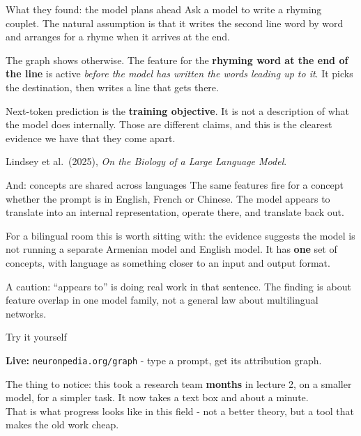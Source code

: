 \documentclass[aspectratio=169]{beamer}
\newcommand{\keybox}[1]{%
  \begin{tcolorbox}[colback=armblue!8, colframe=armblue, boxrule=0.6pt, arc=2pt]
  #1
  \end{tcolorbox}}
\newcommand{\trapbox}[1]{%
  \begin{tcolorbox}[colback=armred!8, colframe=armred, boxrule=0.6pt, arc=2pt]
  #1
  \end{tcolorbox}}
\newcommand{\takebox}[1]{%
  \begin{tcolorbox}[colback=paramgreen!8, colframe=paramgreen, boxrule=0.6pt, arc=2pt]
  #1
  \end{tcolorbox}}
\newcommand{\demobox}[1]{%
  \begin{center}
  \begin{tcolorbox}[colback=violet1!8, colframe=violet1, boxrule=0.7pt, arc=2pt,
                    width=0.9\textwidth]
    \centering\textbf{Live:} #1
  \end{tcolorbox}
  \end{center}}
\begin{document}
\begin{frame}{What they found: the model plans ahead}
  \vspace{0.7em}
  Ask a model to write a rhyming couplet. The natural assumption is that it writes the second
  line word by word and arranges for a rhyme when it arrives at the end.

  \vspace{0.9em}
  \trapbox{The graph shows otherwise. The feature for the \textbf{rhyming word at the end of the
  line} is active \emph{before the model has written the words leading up to it}. It picks the
  destination, then writes a line that gets there.}

  \vspace{0.9em}
  \keybox{Next-token prediction is the \textbf{training objective}. It is not a description of
  what the model does internally. Those are different claims, and this is the clearest evidence
  we have that they come apart.}

  \vspace{0.4em}
  {\footnotesize Lindsey et al.\ (2025), \emph{On the Biology of a Large Language Model}.}
\end{frame}

\begin{frame}{And: concepts are shared across languages}
  \vspace{0.8em}
  The same features fire for a concept whether the prompt is in English, French or Chinese. The
  model appears to translate into an internal representation, operate there, and translate back
  out.

  \vspace{1.0em}
  \keybox{For a bilingual room this is worth sitting with: the evidence suggests the model is not
  running a separate Armenian model and English model. It has \textbf{one} set of concepts, with
  language as something closer to an input and output format.}

  \vspace{0.9em}
  {\footnotesize A caution: ``appears to'' is doing real work in that sentence. The finding is
  about feature overlap in one model family, not a general law about multilingual networks.}
\end{frame}

\begin{frame}{Try it yourself}
  \vspace{1.1em}
  \demobox{\texttt{neuronpedia.org/graph} - type a prompt, get its attribution graph.}

  \vspace{1.1em}
  \takebox{The thing to notice: this took a research team \textbf{months} in lecture 2, on a
  smaller model, for a simpler task. It now takes a text box and about a minute.\\[0.5em]
  That is what progress looks like in this field - not a better theory, but a tool that makes the
  old work cheap.}
\end{frame}
\end{document}
